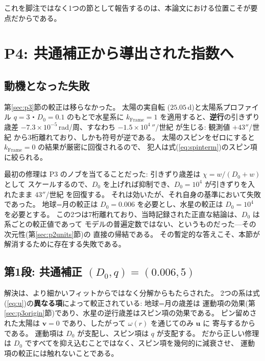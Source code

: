 \documentclass[a4paper,10pt,twocolumn]{ltjsarticle}
\begin{document}
これを脚注ではなく1つの節として報告するのは、本論文における位置こそが要点だからである。

\section{P4: 共通補正から導出された指数へ}
\label{sec:p4}

\subsection{動機となった失敗}
\label{sec:p4fail}

第\ref{sec:p3}節の較正は移らなかった。
太陽の実自転
($25.05$\,d)と太陽系プロファイル $q=3$・$D_0=0.1$ のもとで水星系に
$k_{\mathrm{Frame}}=1$ を適用すると、\textbf{逆行}の引きずり歳差
$-7.3\times10^{-5}$\,rad/周、すなわち $-1.5\times10^{4}\,''$/世紀 が生じる:
観測値 $+43''$/世紀 から3桁離れており、しかも符号が逆である。
太陽のスピンをゼロにすると $k_{\mathrm{Frame}}=0$ の結果が厳密に回復されるので、
犯人は式(\ref{eq:spinterm})のスピン項に絞られる。

最初の修理は P3 のノブを当てることだった: 引きずり歳差は $\chi=w/(D_0+w)$ として
スケールするので、$D_0$ を上げれば抑制でき、$D_0=10^{4}$ が引きずりを入れたまま
$43''$/世紀 を回復する。
それは効いたが、それ自身の基準において失敗であった。
地球=月の較正は $D_0=0.006$ を必要とし、水星の較正は $D_0=10^{4}$ を必要とする。
この2つは7桁離れており、当時記録された正直な結論は、$D_0$ は系ごとの較正値であって
モデルの普遍定数ではない、というものだった---その次元性(第\ref{sec:p2units}節)の
直接の帰結である。
その暫定的な答えこそ、本節が解消するために存在する失敗である。

\subsection{第1段: 共通補正 \texorpdfstring{$(D_0,q)=(0.006,5)$}{(D0,q) = (0.006,5)}}
\label{sec:p4joint}

解決は、より細かいフィットからではなく分解からもたらされた。
2つの系は式(\ref{eq:u})の\textbf{異なる項}によって較正されている: 地球=月の歳差は
運動項の効果(第\ref{sec:p3origin}節)であり、水星の逆行歳差はスピン項の効果である。
ピン留めされた太陽は $\bm v=0$ であり、したがって $\omega(r)$ を通じてのみ $\bm u$ に
寄与するからである。
運動項は $D_0$ が支配し、スピン項は $q$ が支配する。
だから正しい修理は $D_0$ ですべてを抑え込むことではなく、スピン項を幾何的に減衰させ、
運動項の較正には触れないことである。
\end{document}
